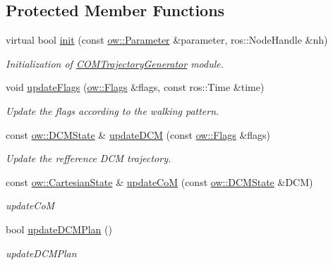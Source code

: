 \subsection*{Protected Member Functions}
\begin{DoxyCompactItemize}
\item 
virtual bool \hyperlink{classow__com__tg_1_1COMTrajectoryGenerator_ab0e21245b1f9f873a1df72969ed5e37d}{init} (const \hyperlink{classow_1_1Parameter}{ow\+::\+Parameter} \&parameter, ros\+::\+Node\+Handle \&nh)\hypertarget{classow__com__tg_1_1COMTrajectoryGenerator_ab0e21245b1f9f873a1df72969ed5e37d}{}\label{classow__com__tg_1_1COMTrajectoryGenerator_ab0e21245b1f9f873a1df72969ed5e37d}

\begin{DoxyCompactList}\small\item\em Initialization of \hyperlink{classow__com__tg_1_1COMTrajectoryGenerator}{C\+O\+M\+Trajectory\+Generator} module. \end{DoxyCompactList}\item 
void \hyperlink{classow__com__tg_1_1COMTrajectoryGenerator_ac25a9836603018d99ba4358e75db1f82}{update\+Flags} (\hyperlink{classow__core_1_1Flags}{ow\+::\+Flags} \&flags, const ros\+::\+Time \&time)
\begin{DoxyCompactList}\small\item\em Update the flags according to the walking pattern. \end{DoxyCompactList}\item 
const \hyperlink{classow__core_1_1DivergentComponentOfMotionState}{ow\+::\+D\+C\+M\+State} \& \hyperlink{classow__com__tg_1_1COMTrajectoryGenerator_af8c3e0ab08b83e84a3ccf458bb1849c5}{update\+D\+CM} (const \hyperlink{classow__core_1_1Flags}{ow\+::\+Flags} \&flags)
\begin{DoxyCompactList}\small\item\em Update the refference D\+CM trajectory. \end{DoxyCompactList}\item 
const \hyperlink{classow__core_1_1CartesianState}{ow\+::\+Cartesian\+State} \& \hyperlink{classow__com__tg_1_1COMTrajectoryGenerator_a335be76bbad7868d6aebada24ca01bcf}{update\+CoM} (const \hyperlink{classow__core_1_1DivergentComponentOfMotionState}{ow\+::\+D\+C\+M\+State} \&D\+CM)
\begin{DoxyCompactList}\small\item\em update\+CoM \end{DoxyCompactList}\item 
bool \hyperlink{classow__com__tg_1_1COMTrajectoryGenerator_a565c271634d4a519a16827daa3180bf3}{update\+D\+C\+M\+Plan} ()
\begin{DoxyCompactList}\small\item\em update\+D\+C\+M\+Plan \end{DoxyCompactList}\end{DoxyCompactItemize}
